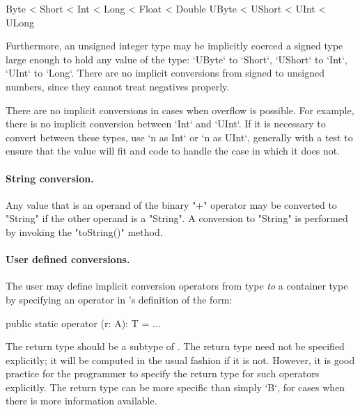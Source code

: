 \begin{xten}
Byte < Short < Int < Long < Float < Double
UByte < UShort < UInt < ULong
\end{xten}

Furthermore, an unsigned integer type may be implicitly coerced a signed type
large 
enough to hold any value of the type: \xcd`UByte` to \xcd`Short`, \xcd`UShort`
to \xcd`Int`, \xcd`UInt` to \xcd`Long`.  There are no implicit conversions
from signed to unsigned numbers, since they cannot treat negatives properly.

There are no implicit conversions in cases when overflow is possible.  For
example, there is no implicit conversion between \xcd`Int` and \xcd`UInt`.  If
it is necessary to convert between these types, use \xcd`n as Int` or 
\xcd`n as UInt`, generally with a test to ensure that the value will fit and
code to handle the case in which it does not.  



\paragraph{String conversion.}
Any value that is an operand of the binary
\xcd"+" operator may
be converted to \xcd"String" if the other operand is a \xcd"String".
A conversion to \xcd"String" is performed by invoking the \xcd"toString()"
method.


\paragraph{User defined conversions.}\label{sec:user-defined-conversions}

The user may define implicit conversion operators from type  {\em to} a
container type  by specifying an operator in 's definition of the form:

\begin{xten}
  public static operator (r: A): T = ... 
\end{xten}

The return type  should be a subtype of . The return
type need not be specified explicitly; it will be computed in the
usual fashion if it is not. However, it is good practice for the
programmer to specify the return type for such operators explicitly.
The return type can be more specific than simply \xcd`B`, for cases when there
is more information available.


